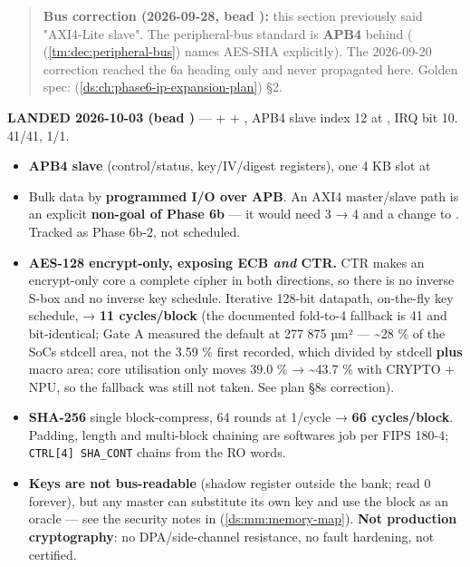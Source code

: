 \begin{record}

\begin{quote}
\textbf{Bus correction (2026-09-28, bead ):} this section
previously said "AXI4-Lite slave". The peripheral-bus standard is
\textbf{APB4} behind 
( (\cref{tm:dec:peripheral-bus}) names AES-SHA
explicitly). The 2026-09-20 correction reached the 6a heading only and
never propagated here. Golden spec:
 (\cref{ds:ch:phase6-ip-expansion-plan}) §2.
\end{quote}

\ok{} \textbf{LANDED 2026-10-03 (bead )} ---
 +  +
, APB4 slave index 12 at ,
IRQ bit 10.  41/41,  1/1.

\begin{itemize}
\tightlist
\item
  \textbf{APB4 slave} (control/\allowbreak{}status,
  key/\allowbreak{}IV/\allowbreak{}digest registers), one 4 KB slot at
\item
  Bulk data by \textbf{programmed I/O over APB}. An AXI4
  master/\allowbreak{}slave path is an explicit \textbf{non-goal of
  Phase 6b} --- it would need  3 → 4 and a change to
  . Tracked as Phase 6b-2, not scheduled.
\item
  \textbf{AES-128 encrypt-only, exposing ECB \emph{and} CTR.} CTR makes
  an encrypt-only core a complete cipher in both directions, so there is
  no inverse S-box and no inverse key schedule. Iterative 128-bit
  datapath, on-the-fly key schedule,  →
  \textbf{11 cycles/\allowbreak{}block} (the documented fold-to-4
  fallback is 41 and bit-identical; Gate A measured the default at 277
  875 µm² --- \textasciitilde28 \% of the SoC\textquotesingle s stdcell
  area, not the 3.59 \% first recorded, which divided by stdcell
  \textbf{plus} macro area; core utilisation only moves 39.0 \% →
  \textasciitilde43.7 \% with CRYPTO + NPU, so the fallback was still
  not taken. See plan §8\textquotesingle s correction).
\item
  \textbf{SHA-256} single block-compress, 64 rounds at 1/cycle →
  \textbf{66 cycles/\allowbreak{}block}. Padding, length and multi-block
  chaining are software\textquotesingle s job per FIPS 180-4;
  \texttt{CTRL[4]\ SHA\_\allowbreak{}CONT} chains from the RO
   words.
\item
  \textbf{Keys are not bus-readable} (shadow register outside the bank;
   read 0 forever), but any master can substitute its own
  key and use the block as an oracle --- see the security notes in
   (\cref{ds:mm:memory-map}). \textbf{Not production cryptography}:
  no DPA/\allowbreak{}side-channel resistance, no fault hardening, not
  certified.
\end{itemize}


\end{record}
